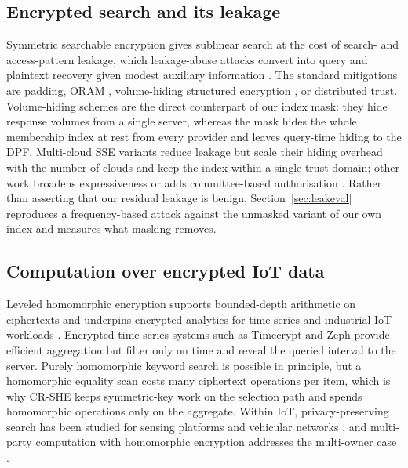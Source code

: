 \documentclass[a4paper,fleqn]{cas-sc}
\begin{document}
\subsection{Encrypted search and its leakage}
Symmetric searchable encryption gives sublinear search at the cost of search-
and access-pattern leakage, which leakage-abuse attacks convert into query and
plaintext recovery given modest auxiliary information
\citep{islam2012access,cash2015leakage,grubbs2017leakage}. The standard
mitigations are padding, ORAM \citep{goldreich1996software}, volume-hiding
structured encryption \citep{kamara2019computationally,patel2019mitigating},
or distributed trust. Volume-hiding schemes are the direct counterpart of our
index mask: they hide response volumes from a single server, whereas the mask
hides the whole membership index at rest from every provider and leaves
query-time hiding to the DPF. Multi-cloud SSE variants
\citep{xu2021privacy,xu2023symmetric} reduce leakage but scale their hiding
overhead with the number of clouds and keep the index within a single trust
domain; other work broadens expressiveness or adds committee-based
authorisation \citep{zhang2024secure,yang2023dynamic,du2022lightweight}.
Rather than asserting that our residual leakage is benign,
Section~\ref{sec:leakeval} reproduces a frequency-based attack against the
unmasked variant of our own index and measures what masking removes.

\subsection{Computation over encrypted IoT data}
Leveled homomorphic encryption \citep{fan2012somewhat,cryptoeprint:2016/421}
supports bounded-depth arithmetic on ciphertexts and underpins encrypted
analytics for time-series and industrial IoT workloads
\citep{halder2022enabling,kamble2024homomorphic}. Encrypted time-series
systems such as Timecrypt \citep{timecrypt} and Zeph \citep{zeph} provide
efficient aggregation but filter only on time and reveal the queried interval
to the server. Purely homomorphic keyword search is possible in principle, but
a homomorphic equality scan costs many ciphertext operations per item, which
is why CR-SHE keeps symmetric-key work on the selection path and spends
homomorphic operations only on the aggregate. Within IoT,
privacy-preserving search has been studied for sensing platforms
\citep{xu2019achieving} and vehicular networks \citep{wu2024distributed}, and
multi-party computation with homomorphic encryption addresses the multi-owner
case \citep{verma2025secure}.
\end{document}
